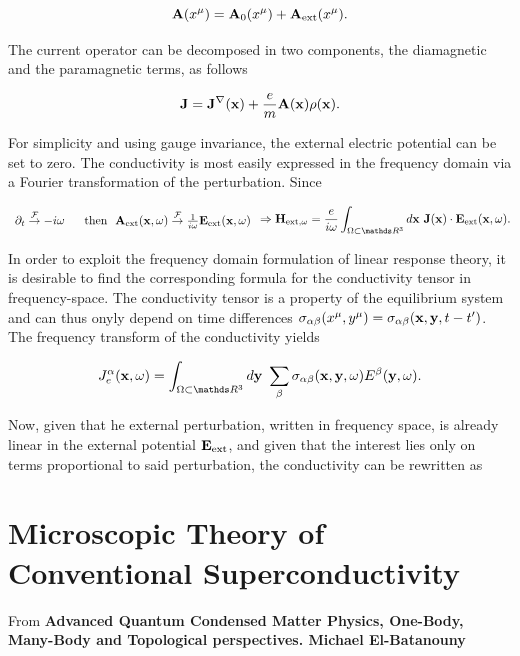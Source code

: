 \documentclass{homework}
\begin{document}
$$
   {\bf A}(x^{\mu}) = {\bf A}_{0}(x^{\mu}) +  {\bf A}_{\textnormal{ext}}(x^{\mu}).
$$

The current operator can be decomposed in two components, the diamagnetic and the paramagnetic terms, as follows 

\begin{equation}
    {\bf J} = {\bf J}^{\nabla}({\bf x}) + \frac{e}{m} {\bf A}({\bf x}) \rho({\bf x}).  
\end{equation}

For simplicity and using gauge invariance, the external electric potential can be set to zero. The conductivity is most easily expressed in the frequency domain via a Fourier transformation of the perturbation. Since 

\begin{equation} \begin{array}{cc}
     \partial_t \overset{\mathcal{F}}{\rightarrow} -i\omega \blanky & \textnormal{ then } \blanky {\bf A}_{\textnormal{ext}}({\bf x}, \omega) \overset{\mathcal{F}}{\rightarrow}  \frac{1}{i\omega} {\bf E}_{\textnormal{ext}}({\bf x}, \omega) \\
\end{array}
     \Rightarrow \Hamiltonian_{\textnormal{ext}, \omega} = \frac{e}{i\omega} \int_{\Omega \subset \R^3} d{\bf x} \blanky {\bf J}({\bf x}) \cdot {\bf E}_{\textnormal{ext}}({\bf x}, \omega).
\end{equation}

In order to exploit the frequency domain formulation of linear response theory, it is desirable to find the corresponding formula for the conductivity tensor in frequency-space. The conductivity tensor is a property of the equilibrium system and can thus onyly depend on time differences $ \sigma_{\alpha \beta}(x^\mu, y^{\mu}) =  \sigma_{\alpha \beta}({\bf x},{\bf y}, t-t')$. The frequency transform of the conductivity yields

\begin{equation}
    J^{\alpha}_{e}({\bf x}, \omega) = \int_{\Omega \subset \R^3 } d{\bf y} \blanky \sum_{ \beta} \sigma_{\alpha \beta}({\bf x},{\bf y}, \omega) E^{\beta}({\bf y}, \omega).
\end{equation}

Now, given that he external perturbation, written in frequency space, is already linear in the external potential ${\bf E}_{\textnormal{ext}}$, and given that the interest lies only on terms proportional to said perturbation, the conductivity can be rewritten as 

\clearpage

\section{Microscopic Theory of Conventional Superconductivity}

From \textbf{Advanced Quantum Condensed Matter Physics, One-Body, Many-Body and Topological perspectives. Michael El-Batanouny} \\

\paragraph{\textbf{}}





\end{document}
